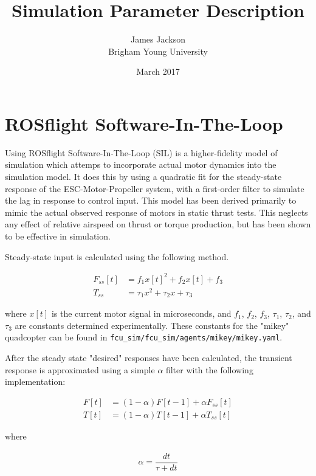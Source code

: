\documentclass{article}
\title{Simulation Parameter Description}
\author{James Jackson \\ Brigham Young University}
\date{March 2017}
\begin{document}
\maketitle

\section{ROSflight Software-In-The-Loop}

Using ROSflight Software-In-The-Loop (SIL) is a higher-fidelity model of simulation which attemps to incorporate actual motor dynamics into the simulation model.  It does this by using a quadratic fit for the steady-state response of the ESC-Motor-Propeller system, with a first-order filter to simulate the lag in response to control input. This model has been derived primarily to mimic the actual observed response of motors in static thrust tests.  This neglects any effect of relative airspeed on thrust or torque production, but has been shown to be effective in simulation.

Steady-state input is calculated using the following method.

\begin{equation}
\begin{aligned}
	F_{ss}[t] &= f_1 x[t]^2 + f_2 x[t] + f_3 \\
	T_{ss} &= \tau_1 x^2 + \tau_2 x + \tau_3
\end{aligned}
\end{equation}

where $x[t]$ is the current motor signal in microseconds, and $f_1$, $f_2$, $f_3$, $\tau_1$, $\tau_2$, and $\tau_3$ are constants determined experimentally.  These constants for the "mikey" quadcopter can be found in \verb|fcu_sim/fcu_sim/agents/mikey/mikey.yaml|.

After the steady state "desired" responses have been calculated, the transient response is approximated using a simple $\alpha$ filter with the following implementation:

\begin{equation}
\begin{aligned}
	F[t] &= (1 - \alpha)F[t-1] + \alpha F_{ss}[t] \\
	T[t] &= (1 - \alpha)T[t-1] + \alpha T_{ss}[t]
\end{aligned}
\end{equation}

where 

\begin{equation}
\begin{aligned}
	\alpha = \dfrac{dt}{\tau + dt}
\end{aligned}
\end{equation}
\end{document}
